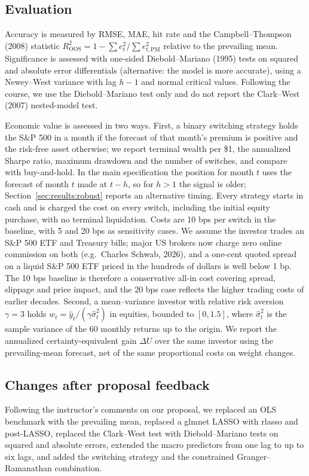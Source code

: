 \documentclass[11pt,a4paper]{article}
\begin{document}
\subsection{Evaluation}\label{sec:method:eval}
Accuracy is measured by RMSE, MAE, hit rate and the Campbell--Thompson
(2008) statistic $R^2_{\mathrm{OOS}}=1-\sum e_t^2/\sum e_{t,\mathrm{PM}}^2$
relative to the prevailing mean. Significance is assessed with one-sided
Diebold--Mariano (1995) tests on squared and absolute error differentials
(alternative: the model is more accurate), using a Newey--West variance with
lag $h-1$ and normal critical values. Following the course, we use the
Diebold--Mariano test only and do not report the Clark--West (2007)
nested-model test.

Economic value is assessed in two ways. First, a binary switching strategy
holds the S\&P 500 in a month if the forecast of that month's premium is
positive and the risk-free asset otherwise; we report terminal wealth per
\$1, the annualized Sharpe ratio, maximum drawdown and the number of
switches, and compare with buy-and-hold. In the main specification the
position for month $t$ uses the forecast of month $t$ made at $t-h$, so for
$h>1$ the signal is older; Section~\ref{sec:results:robust} reports an
alternative timing. Every strategy starts in cash and is charged the cost
on every switch, including the initial equity purchase, with no terminal
liquidation. Costs are 10 bps per switch in the baseline, with 5 and 20 bps
as sensitivity cases. We assume the investor trades an S\&P 500 ETF and
Treasury bills; major US brokers now charge zero online commission on both
(e.g.\ Charles Schwab, 2026), and a one-cent quoted spread on a liquid
S\&P 500 ETF priced in the hundreds of dollars is well below 1 bp. The
10 bps baseline is therefore a conservative all-in cost covering spread,
slippage and price impact, and the 20 bps case reflects the higher trading
costs of earlier decades. Second, a mean--variance investor with relative
risk aversion $\gamma=3$ holds $w_t=\hat y_t/(\gamma\hat\sigma^2_t)$ in
equities, bounded to $[0,1.5]$, where $\hat\sigma^2_t$ is the sample
variance of the 60 monthly returns up to the origin. We report the
annualized certainty-equivalent gain $\Delta U$ over the same investor
using the prevailing-mean forecast, net of the same proportional costs on
weight changes.

\subsection{Changes after proposal feedback}\label{sec:method:changes}
Following the instructor's comments on our proposal, we replaced an OLS
benchmark with the prevailing mean, replaced a glmnet LASSO
with rlasso and post-LASSO, replaced the Clark--West test with
Diebold--Mariano tests on squared and absolute errors, extended the macro
predictors from one lag to up to six lags, and added the switching strategy
and the constrained Granger--Ramanathan combination.
\end{document}
